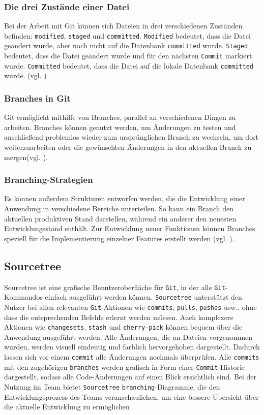 \documentclass[oneside]{ausarbeitung}
\begin{document}
\subsubsection{Die drei Zustände einer Datei}
Bei der Arbeit mit Git können sich Dateien in drei verschiedenen Zuständen befinden: \texttt{modified}, \texttt{staged} und \texttt{committed}.  
\texttt{Modified} bedeutet, dass die Datei geändert wurde, aber noch nicht auf die Datenbank \texttt{committed} wurde.  
\texttt{Staged} bedeutet, dass die Datei geändert wurde und für den nächsten \texttt{Commit} markiert wurde.  
\texttt{Committed} bedeutet, dass die Datei auf die lokale Datenbank \texttt{committed} wurde.
(vgl. \parencite{git_intro})

\subsubsection{Branches in Git}
Git ermöglicht mithilfe von Branches, parallel an verschiedenen Dingen zu arbeiten. Branches können genutzt werden, um Änderungen zu testen und anschließend problemlos wieder zum ursprünglichen Branch zu wechseln, um dort weiterzuarbeiten oder die gewünschten Änderungen in den aktuellen Branch zu mergen(vgl. \parencite{git-branching-merging}).  

\subsubsection{Branching-Strategien}
Es können außerdem Strukturen entworfen werden, die die Entwicklung einer Anwendung in verschiedene Bereiche unterteilen. So kann ein Branch den aktuellen produktiven Stand darstellen, während ein anderer den neuesten Entwicklungsstand enthält. Zur Entwicklung neuer Funktionen können Branches speziell für die Implementierung einzelner Features erstellt werden (vgl. \parencite{git-branching-merging}).


\subsection{Sourcetree}
Sourcetree ist eine grafische Benutzeroberfläche für \texttt{Git}, in der alle \texttt{Git}-Kommandos einfach ausgeführt werden können. \texttt{Sourcetree} unterstützt den Nutzer bei allen relevanten \texttt{Git}-Aktionen wie \texttt{commits}, \texttt{pulls}, \texttt{pushes} usw., ohne dass die entsprechenden Befehle erlernt werden müssen. Auch komplexere Aktionen wie \texttt{changesets}, \texttt{stash} und \texttt{cherry-pick} können bequem über die Anwendung ausgeführt werden.
Alle Änderungen, die an Dateien vorgenommen wurden, werden visuell eindeutig und farblich hervorgehoben dargestellt. Dadurch lassen sich vor einem \texttt{commit} alle Änderungen nochmals überprüfen.
Alle \texttt{commits} mit den zugehörigen \texttt{branches} werden grafisch in Form einer \texttt{Commit}-Historie dargestellt, sodass alle Code-Änderungen auf einen Blick ersichtlich sind.
Bei der Nutzung im Team bietet \texttt{Sourcetree} \texttt{branching}-Diagramme, die den Entwicklungsprozess des Teams veranschaulichen, um eine bessere Übersicht über die aktuelle Entwicklung zu ermöglichen \parencite{sourcetree}. 
\end{document}
